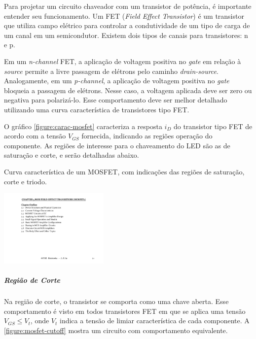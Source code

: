	Para projetar um circuito chaveador com um transistor de potência, é importante entender seu funcionamento. Um FET (\emph{Field Effect Transistor}) é um transistor que utiliza campo elétrico para controlar a condutividade de um tipo de carga de um canal em um semicondutor. Existem dois tipos de canais para transistores: n e p.

	Em um \textit{n-channel} FET, a aplicação de voltagem positiva no \textit{gate} em relação à \textit{source} permite a livre passagem de elétrons pelo caminho \textit{drain-source}. Analogamente, em um \textit{p-channel}, a aplicação de voltagem positiva no \textit{gate} bloqueia a passagem de elétrons. Nesse caso, a voltagem aplicada deve ser zero ou negativa para polarizá-lo. Esse comportamento deve ser melhor detalhado utilizando uma curva característica de transistores tipo FET.

	O gráfico \ref{figure:carac-mosfet} caracteriza a resposta $i_{D}$ do transistor tipo FET de acordo com a tensão $V_{GS}$ fornecida, indicando as regiões operação do componente. As regiões de interesse para o chaveamento do LED são as de saturação e corte, e serão detalhadas abaixo.

	\begin{chart}[h]
		\caption{\label{figure:carac-mosfet}Curva característica de um MOSFET, com indicações das regiões de saturação, corte e triodo.}
		\centering
		\includegraphics[page=8,width=0.4\textwidth, trim={16.5cm 9.89cm 3.6cm 3cm},clip]{circuits/Electronics_Ch5.pdf}
	\end{chart}

	\subparagraph*{Região de Corte}
	Na região de corte, o transistor se comporta como uma chave aberta. Esse comportamento é visto em todos transistores FET em que se aplica uma tensão $V_{GS} \leq V_{t}$, onde $V_{t}$ indica a tensão de limiar  característica de cada componente. A \autoref{figure:mosfet-cutoff} mostra um circuito com comportamento equivalente.

